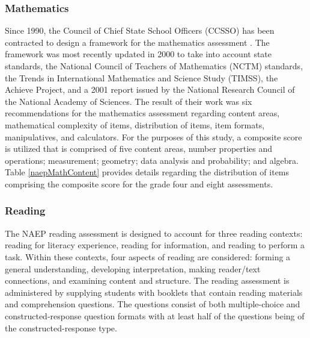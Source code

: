 \documentclass[letterpaper,12pt]{article} %
\begin{document}
\subsubsection{Mathematics}

Since 1990, the Council of Chief State School Officers (CCSSO) has been contracted to design a framework for the mathematics assessment \cite{naepmath}. The framework was most recently updated in 2000 to take into account state standards, the National Council of Teachers of Mathematics (NCTM) standards, the Trends in International Mathematics and Science Study (TIMSS), the Achieve Project, and a 2001 report issued by the National Research Council of the National Academy of Sciences. The result of their work was six recommendations for the mathematics assessment regarding content areas, mathematical complexity of items, distribution of items, item formats, manipulatives, and calculators. For the purposes of this study, a composite score is utilized that is comprised of five content areas, number properties and operations; measurement; geometry; data analysis and probability; and algebra. Table \ref{naepMathContent} provides details regarding the distribution of items comprising the composite score for the grade four and eight assessments.



\subsubsection{Reading}

The NAEP reading assessment \cite{naepreading} is designed to account for three reading contexts: reading for literacy experience, reading for information, and reading to perform a task. Within these contexts, four aspects of reading are considered: forming a general understanding, developing interpretation, making reader/text connections, and examining content and structure. The reading assessment is administered by supplying students with booklets that contain reading materials and comprehension questions. The questions consist of both multiple-choice and constructed-response question formats with at least half of the questions being of the constructed-response type. 
\end{document}
